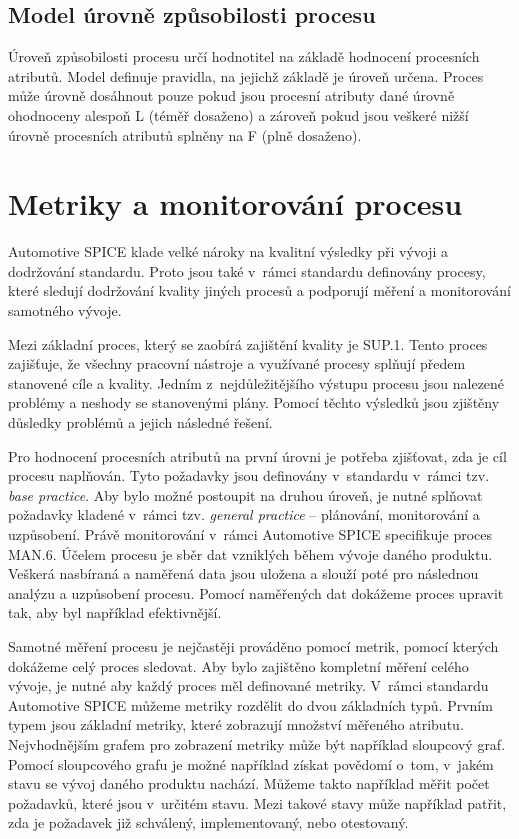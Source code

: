 \documentclass[czech,master]{diploma}
\begin{document}
\subsection{Model úrovně způsobilosti procesu}
Úroveň způsobilosti procesu určí hodnotitel na základě hodnocení procesních atributů. Model definuje  pravidla, na jejichž základě je úroveň určena. Proces může úrovně dosáhnout pouze pokud jsou procesní atributy dané úrovně ohodnoceny alespoň L (téměř dosaženo) a zároveň pokud jsou veškeré nižší úrovně procesních atributů splněny na F (plně dosaženo).


\section{Metriky a monitorování procesu}
Automotive SPICE klade velké nároky na kvalitní výsledky při vývoji a dodržování standardu. Proto jsou také v~rámci standardu definovány procesy, které sledují dodržování kvality jiných procesů a podporují měření a monitorování samotného vývoje. 

Mezi základní proces, který se zaobírá zajištění kvality je SUP.1. Tento proces zajišťuje, že všechny pracovní nástroje a využívané procesy splňují předem stanovené cíle a kvality. Jedním z~nejdůležitějšího výstupu procesu jsou nalezené problémy a neshody se stanovenými plány. Pomocí těchto výsledků jsou zjištěny důsledky problémů a jejich následné řešení.

Pro hodnocení procesních atributů na první úrovni je potřeba zjišťovat, zda je cíl procesu naplňován. Tyto požadavky jsou definovány v~standardu v~rámci tzv. \textit{base practice}. Aby bylo možné postoupit na druhou úroveň, je nutné splňovat požadavky kladené v~rámci tzv. \textit{general practice} -- plánování, monitorování a uzpůsobení. Právě monitorování v~rámci Automotive SPICE specifikuje proces MAN.6. Účelem procesu je sběr dat vzniklých během vývoje daného produktu. Veškerá nasbíraná a naměřená data jsou uložena a slouží poté pro následnou analýzu a uzpůsobení procesu. Pomocí naměřených dat dokážeme proces upravit tak, aby byl například efektivnější. 

Samotné měření procesu je nejčastěji prováděno pomocí metrik, pomocí kterých dokážeme celý proces sledovat. Aby bylo zajištěno kompletní měření celého vývoje, je nutné aby každý proces měl definované metriky. V~rámci standardu Automotive SPICE můžeme metriky rozdělit do dvou základních typů. Prvním typem jsou základní metriky, které zobrazují množství měřeného atributu. Nejvhodnějším grafem pro zobrazení metriky může být například sloupcový graf. Pomocí sloupcového grafu je možné například získat povědomí o~tom, v~jakém stavu se vývoj daného produktu nachází. Můžeme takto například měřit počet požadavků, které jsou v~určitém stavu. Mezi takové stavy může například patřit, zda je požadavek již schválený, implementovaný, nebo otestovaný.
\end{document}
